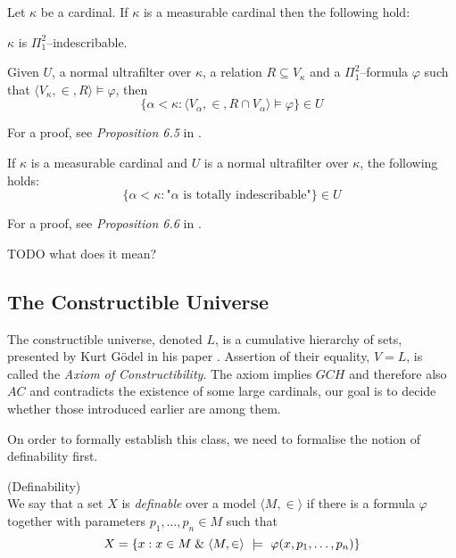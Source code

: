 \begin{theorem}
Let $\kappa$ be a cardinal. If $\kappa$ is a measurable cardinal then the following hold:
\bce[(i)]
\item $\kappa$ is $\Pi^2_1$–indescribable.
\item Given $U$, a normal ultrafilter over $\kappa$, a relation $R \subseteq V_\kappa$ and a $\Pi^2_1$–formula $\varphi$ such that $\langle V_\kappa, \in, R \rangle \models \varphi$, then
\begin{equation}
\{ \alpha < \kappa : \langle V_\alpha, \in, R \cap V_\alpha \rangle \models \varphi \} \in U
\end{equation}
\ece
\end{theorem}
For a proof, see \emph{Proposition 6.5} in \cite{KanamoriBook}.

\begin{theorem}
If $\kappa$ is a measurable cardinal and $U$ is a normal ultrafilter over $\kappa$, the following holds:
\begin{equation}
\{ \alpha < \kappa: \mbox{"$\alpha$ is totally indescribable"}\} \in U
\end{equation}
\end{theorem}
For a proof, see \emph{Proposition 6.6} in \cite{KanamoriBook}.

TODO what does it mean?



\subsection{The Constructible Universe}

The constructible universe, denoted $L$, is a cumulative hierarchy of sets, presented by Kurt Gödel in his paper \cite{Godel1940consistency}.
Assertion of their equality, $V=L$, is called the \emph{Axiom of Constructibility}. The axiom implies $GCH$ and therefore also $AC$ and contradicts the existence of some large cardinals, our goal is to decide whether those introduced earlier are among them.

On order to formally establish this class, we need to formalise the notion of definability first. 
\begin{definition}{(Definability)}\label{def:definability}\\ %
We say that a set $X$ is \emph{definable} over a model $\langle M, \in \rangle$ if there is a formula $\varphi$ together with parameters $p_1, \ldots, p_n \in M$ such that
\begin{equation}
X = \{x: x \in M \mathrel{\&} \langle M, \in \rangle~\models~\varphi(x, p_1, \ldots, p_n)\}
\end{equation}
\end{definition}

